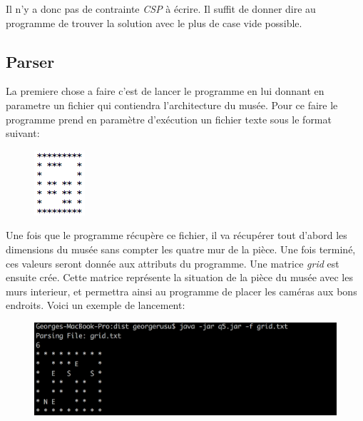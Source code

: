 \documentclass[a4paper,10pt]{article}
\begin{document}
\par Il n'y a donc pas de contrainte \emph{CSP} à écrire.  Il suffit de donner dire au programme de trouver la solution avec le plus de case vide possible.

\subsection{Parser}
\par La premiere chose a faire c'est de lancer le programme en lui donnant en parametre un fichier qui contiendra l'architecture du musée. Pour ce faire le programme prend en paramètre d'exécution un fichier texte sous le format suivant:
\begin{figure}[!h]
\begin{center}
\includegraphics{img/gridExample.png}
\end{center}
\end{figure}

\par Une fois que le programme récupère ce fichier, il va récupérer tout d'abord les dimensions du musée sans compter les quatre mur de la pièce.  Une fois terminé, ces valeurs seront donnée aux attributs du programme. Une matrice \emph{grid} est ensuite crée.  Cette matrice représente la situation de la pièce du musée avec les murs interieur, et permettra ainsi au programme de placer les caméras aux bons endroits. Voici un exemple de lancement:
\begin{figure}[!h]
\includegraphics[width=450px]{img/q5.png}

\end{figure}
\end{document}

